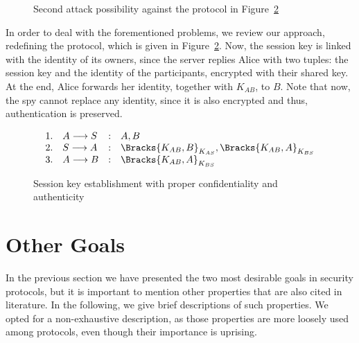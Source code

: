 \begin{figure}[ht]\label{fig:auth-attack2}
  \centering

  \caption{Second attack possibility against the protocol in Figure~\ref{prt:session-key-auth}}
\end{figure}

In order to deal with the forementioned problems, we review our approach, redefining the protocol, which is given in Figure~\ref{prt:session-key-auth}. Now, the session key is linked with the identity of its owners, since the server replies Alice with two tuples: the session key and the identity of the participants, encrypted with their shared key. At the end, Alice forwards her identity, together with \(K_{AB}\), to \(B\). Note that now, the spy cannot replace any identity, since it is also encrypted and thus, authentication is preserved.

\begin{figure}[ht]\label{prt:session-key-auth}
  \centering
  \[
    \begin{array}{rlcl}
      1. & A \longrightarrow S &:& A, B \\
      2. & S \longrightarrow A &:& \Bracks{K_{AB}, B}_{K_{AS}}, \Bracks{K_{AB}, A}_{K_{BS}} \\
      3. & A \longrightarrow B &:& \Bracks{K_{AB}, A}_{K_{BS}} \\
    \end{array}
  \]
  \caption{Session key establishment with proper confidentiality and authenticity}
\end{figure}





\section{Other Goals}
In the previous section we have presented the two most desirable goals in security protocols, but it is important to mention other properties that are also cited in literature. In the following, we give brief descriptions of such properties. We opted for a non-exhaustive description, as those properties are more loosely used among protocols, even though their importance is uprising.

